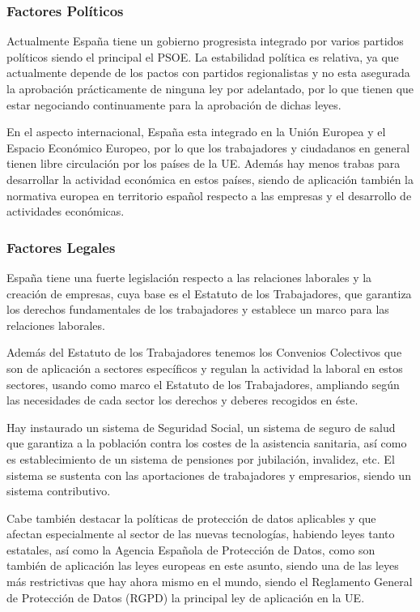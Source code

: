 \subsubsection{Factores Políticos}
Actualmente España tiene un gobierno progresista integrado por varios partidos políticos siendo el principal el PSOE. La estabilidad política es relativa, ya que actualmente depende de los pactos con partidos regionalistas y no esta asegurada la aprobación prácticamente de ninguna ley por adelantado, por lo que tienen que estar negociando continuamente para la aprobación de dichas leyes.

En el aspecto internacional, España esta integrado en la Unión Europea y el Espacio Económico Europeo, por lo que los trabajadores y ciudadanos en general tienen libre circulación por los países de la UE. Además hay menos trabas para desarrollar la actividad económica en estos países, siendo de aplicación también la normativa europea en territorio español respecto a las empresas y el desarrollo de actividades económicas.

\subsubsection{Factores Legales}
España tiene una fuerte legislación respecto a las relaciones laborales y la creación de empresas, cuya base es el Estatuto de los Trabajadores, que garantiza los derechos fundamentales de los trabajadores y establece un marco para las relaciones laborales.

Además del Estatuto de los Trabajadores tenemos los Convenios Colectivos que son de aplicación a sectores específicos y regulan la actividad la laboral en estos sectores, usando como marco el Estatuto de los Trabajadores, ampliando según las necesidades de cada sector los derechos y deberes recogidos en éste.

Hay instaurado un sistema de Seguridad Social, un sistema de seguro de salud que garantiza a la población contra los costes de la asistencia sanitaria, así como es establecimiento de un sistema de pensiones por jubilación, invalidez, etc. El sistema se sustenta con las aportaciones de trabajadores y empresarios, siendo un sistema contributivo.

Cabe también destacar la políticas de protección de datos aplicables y que afectan especialmente al sector de las nuevas tecnologías, habiendo leyes tanto estatales, así como la Agencia Española de Protección de Datos, como son también de aplicación las leyes europeas en este asunto, siendo una de las leyes más restrictivas que hay ahora mismo en el mundo, siendo el Reglamento General de Protección de Datos (RGPD) la principal ley de aplicación en la UE.

